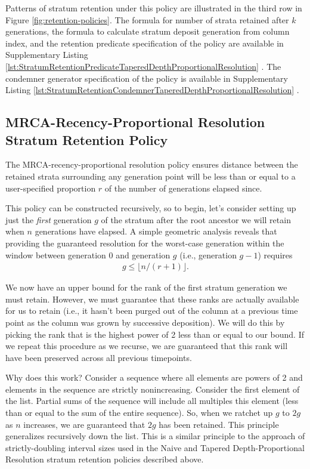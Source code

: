 Patterns of stratum retention under this policy are illustrated in the third row in Figure \ref{fig:retention-policies}.
The formula for number of strata retained after $k$ generations, the formula to calculate stratum deposit generation from column index, and the retention predicate specification of the policy are available in Supplementary Listing \ref{lst:StratumRetentionPredicateTaperedDepthProportionalResolution} \citep{moreno2022hstratconceptsupplement}.
The condemner generator specification of the policy is available in Supplementary Listing \ref{lst:StratumRetentionCondemnerTaperedDepthProportionalResolution} \citep{moreno2022hstratconceptsupplement}.

\subsection{MRCA-Recency-Proportional Resolution Stratum Retention Policy}



The MRCA-recency-proportional resolution policy ensures distance between the retained strata surrounding any generation point will be less than or equal to a user-specified proportion $r$ of the number of generations elapsed since.

This policy can be constructed recursively, so to begin, let's consider setting up just the \textit{first} generation $g$ of the stratum after the root ancestor we will retain when $n$ generations have elapsed.
A simple geometric analysis reveals that providing the guaranteed resolution for the worst-case generation within the window between generation 0 and generation $g$ (i.e., generation $g-1$) requires
\begin{align*}
  g \leq \lfloor n / (r + 1) \rfloor.
\end{align*}

We now have an upper bound for the rank of the first stratum generation
we must retain.
However, we must guarantee that these ranks are actually available for us to retain (i.e., it hasn't been purged out of the column at a previous time point as the column was grown by successive deposition).
We will do this by picking the rank that is the highest power of 2 less than or equal to our bound.
If we repeat this procedure as we recurse, we are guaranteed that this rank will have been preserved across all previous timepoints.

Why does this work?
Consider a sequence where all elements are powers of 2 and elements in the sequence are strictly nonincreasing.
Consider the first element of the list.
Partial sums of the sequence will include all multiples this element (less than or equal to the sum of the entire sequence).
So, when we ratchet up $g$ to $2g$ as $n$ increases, we are guaranteed that $2g$ has been retained.
This principle generalizes recursively down the list.
This is a similar principle to the approach of strictly-doubling interval sizes used in the Naive and Tapered Depth-Proportional Resolution stratum retention policies described above.

